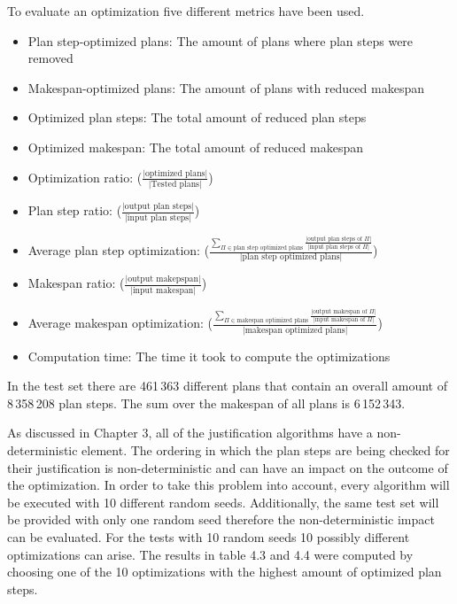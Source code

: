 To evaluate an optimization five different metrics have been used.
\begin{itemize}
    \item Plan step-optimized plans: The amount of plans where plan steps were removed
    \item Makespan-optimized plans: The amount of plans with reduced makespan
    \item Optimized plan steps: The total amount of reduced plan steps
    \item Optimized makespan: The total amount of reduced makespan
    \item Optimization ratio: ($\frac{\vert \text{optimized plans} \vert}{\vert \text{Tested plans} \vert}$)
    \item Plan step ratio: ($\frac{\vert \text{output plan steps} \vert}{\vert \text{input plan steps} \vert}$)
    \item Average plan step optimization: ($\frac{\sum_{\Pi \in \text{plan step optimized plans}}\frac{\vert \text{output plan steps of } \Pi \vert} {\vert \text{input plan steps of } \Pi\vert}}{\vert \text{plan step optimized plans} \vert} $)
    \item Makespan ratio: ($\frac{\vert \text{output makepspan} \vert}{\vert \text{input makespan} \vert}$)
    \item Average makespan optimization: ($\frac{\sum_{\Pi \in  \text{makespan optimized plans}}\frac{\vert \text{output makespan of } \Pi \vert} {\vert \text{input makespan of } \Pi\vert}}{\vert \text{makespan optimized plans} \vert} $)
    \item Computation time: The time it took to compute the optimizations 
\end{itemize}

In the test set there are 461\,363 different plans that contain an overall amount of 8\,358\,208 plan steps.
The sum over the makespan of all plans is 6\,152\,343. 

As discussed in Chapter 3, all of the justification algorithms have a non-deterministic element.
The ordering in which the plan steps are being checked for their justification
is non-deterministic and can have an impact on the outcome of the optimization.
In order to take this problem into account, every algorithm will be executed with 10 different random seeds.
Additionally, the same test set will be provided with only one random seed therefore the non-deterministic impact can be evaluated.
For the tests with 10 random seeds 10 possibly different optimizations can arise.
The results in table 4.3 and 4.4 were computed by choosing one of the 10 optimizations with 
the highest amount of optimized plan steps.


